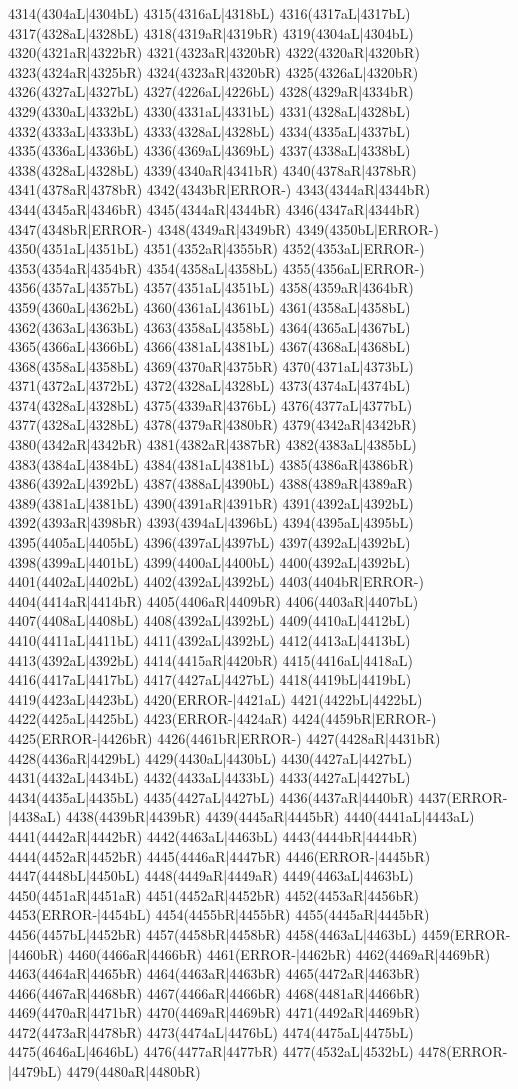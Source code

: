 4314(4304aL|4304bL) 4315(4316aL|4318bL) 4316(4317aL|4317bL) 4317(4328aL|4328bL) 4318(4319aR|4319bR) 4319(4304aL|4304bL) 4320(4321aR|4322bR) 4321(4323aR|4320bR) 4322(4320aR|4320bR) 4323(4324aR|4325bR) 4324(4323aR|4320bR) 4325(4326aL|4320bR) 4326(4327aL|4327bL) 4327(4226aL|4226bL) 4328(4329aR|4334bR) 4329(4330aL|4332bL) 4330(4331aL|4331bL) 4331(4328aL|4328bL) 4332(4333aL|4333bL) 4333(4328aL|4328bL) 4334(4335aL|4337bL) 4335(4336aL|4336bL) 4336(4369aL|4369bL) 4337(4338aL|4338bL) 4338(4328aL|4328bL) 4339(4340aR|4341bR) 4340(4378aR|4378bR) 4341(4378aR|4378bR) 4342(4343bR|ERROR-) 4343(4344aR|4344bR) 4344(4345aR|4346bR) 4345(4344aR|4344bR) 4346(4347aR|4344bR) 4347(4348bR|ERROR-) 4348(4349aR|4349bR) 4349(4350bL|ERROR-) 4350(4351aL|4351bL) 4351(4352aR|4355bR) 4352(4353aL|ERROR-) 4353(4354aR|4354bR) 4354(4358aL|4358bL) 4355(4356aL|ERROR-) 4356(4357aL|4357bL) 4357(4351aL|4351bL) 4358(4359aR|4364bR) 4359(4360aL|4362bL) 4360(4361aL|4361bL) 4361(4358aL|4358bL) 4362(4363aL|4363bL) 4363(4358aL|4358bL) 4364(4365aL|4367bL) 4365(4366aL|4366bL) 4366(4381aL|4381bL) 4367(4368aL|4368bL) 4368(4358aL|4358bL) 4369(4370aR|4375bR) 4370(4371aL|4373bL) 4371(4372aL|4372bL) 4372(4328aL|4328bL) 4373(4374aL|4374bL) 4374(4328aL|4328bL) 4375(4339aR|4376bL) 4376(4377aL|4377bL) 4377(4328aL|4328bL) 4378(4379aR|4380bR) 4379(4342aR|4342bR) 4380(4342aR|4342bR) 4381(4382aR|4387bR) 4382(4383aL|4385bL) 4383(4384aL|4384bL) 4384(4381aL|4381bL) 4385(4386aR|4386bR) 4386(4392aL|4392bL) 4387(4388aL|4390bL) 4388(4389aR|4389aR) 4389(4381aL|4381bL) 4390(4391aR|4391bR) 4391(4392aL|4392bL) 4392(4393aR|4398bR) 4393(4394aL|4396bL) 4394(4395aL|4395bL) 4395(4405aL|4405bL) 4396(4397aL|4397bL) 4397(4392aL|4392bL) 4398(4399aL|4401bL) 4399(4400aL|4400bL) 4400(4392aL|4392bL) 4401(4402aL|4402bL) 4402(4392aL|4392bL) 4403(4404bR|ERROR-) 4404(4414aR|4414bR) 4405(4406aR|4409bR) 4406(4403aR|4407bL) 4407(4408aL|4408bL) 4408(4392aL|4392bL) 4409(4410aL|4412bL) 4410(4411aL|4411bL) 4411(4392aL|4392bL) 4412(4413aL|4413bL) 4413(4392aL|4392bL) 4414(4415aR|4420bR) 4415(4416aL|4418aL) 4416(4417aL|4417bL) 4417(4427aL|4427bL) 4418(4419bL|4419bL) 4419(4423aL|4423bL) 4420(ERROR-|4421aL) 4421(4422bL|4422bL) 4422(4425aL|4425bL) 4423(ERROR-|4424aR) 4424(4459bR|ERROR-) 4425(ERROR-|4426bR) 4426(4461bR|ERROR-) 4427(4428aR|4431bR) 4428(4436aR|4429bL) 4429(4430aL|4430bL) 4430(4427aL|4427bL) 4431(4432aL|4434bL) 4432(4433aL|4433bL) 4433(4427aL|4427bL) 4434(4435aL|4435bL) 4435(4427aL|4427bL) 4436(4437aR|4440bR) 4437(ERROR-|4438aL) 4438(4439bR|4439bR) 4439(4445aR|4445bR) 4440(4441aL|4443aL) 4441(4442aR|4442bR) 4442(4463aL|4463bL) 4443(4444bR|4444bR) 4444(4452aR|4452bR) 4445(4446aR|4447bR) 4446(ERROR-|4445bR) 4447(4448bL|4450bL) 4448(4449aR|4449aR) 4449(4463aL|4463bL) 4450(4451aR|4451aR) 4451(4452aR|4452bR) 4452(4453aR|4456bR) 4453(ERROR-|4454bL) 4454(4455bR|4455bR) 4455(4445aR|4445bR) 4456(4457bL|4452bR) 4457(4458bR|4458bR) 4458(4463aL|4463bL) 4459(ERROR-|4460bR) 4460(4466aR|4466bR) 4461(ERROR-|4462bR) 4462(4469aR|4469bR) 4463(4464aR|4465bR) 4464(4463aR|4463bR) 4465(4472aR|4463bR) 4466(4467aR|4468bR) 4467(4466aR|4466bR) 4468(4481aR|4466bR) 4469(4470aR|4471bR) 4470(4469aR|4469bR) 4471(4492aR|4469bR) 4472(4473aR|4478bR) 4473(4474aL|4476bL) 4474(4475aL|4475bL) 4475(4646aL|4646bL) 4476(4477aR|4477bR) 4477(4532aL|4532bL) 4478(ERROR-|4479bL) 4479(4480aR|4480bR) 